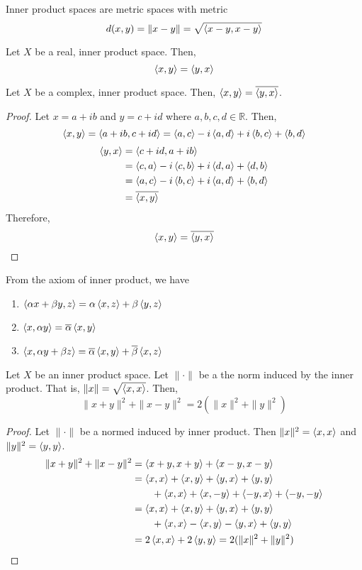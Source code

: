 \begin{remark}
	Inner product spaces are metric spaces with metric 
	\[ d(x,y) = \|x-y\| = \sqrt{\inner{x-y}{x-y}} \]
\end{remark}
\begin{remark}
	Let $X$ be a real, inner product space.
	Then, 
	\[ \inner{x}{y} = \inner{y}{x} \]
\end{remark}
\begin{remark}
	Let $X$ be a complex, inner product space.
	Then, $\inner{x}{y} = \conj{\inner{y}{x}}$.
\end{remark}
\begin{proof}
	Let $x = a+ib$ and $y = c+id$ where $a,b,c,d \in \mathbb{R}$.
	Then,
	\[ \inner{x}{y} = \inner{a+ib}{c+id} = \inner{a}{c} -i\inner{a}{d} + i\inner{b}{c} + \inner{b}{d} \]
	\begin{align*}
		\inner{y}{x} 
		& = \inner{c+id}{a+ib} \\
		& = \inner{c}{a} -i\inner{c}{b} + i\inner{d}{a} + \inner{d}{b} \\
		& = \inner{a}{c} -i\inner{b}{c} + i\inner{a}{d} + \inner{b}{d} \\
		& = \conj{\inner{x}{y}}
	\end{align*}
	Therefore,
	\[ \inner{x}{y} = \conj{\inner{y}{x}} \]
\end{proof}
\begin{remark}
	From the axiom of inner product, we have
	\begin{enumerate}
		\item $ \inner{\alpha x + \beta y}{z} = \alpha\inner{x}{z} + \beta\inner{y}{z}$
		\item $\inner{x}{\alpha y} = \conj{\alpha} \inner{x}{y}$
		\item $\inner{x}{\alpha y+\beta z} = \conj{\alpha}\inner{x}{y} + \conj{\beta}\inner{x}{z}$
	\end{enumerate}
\end{remark}

\begin{lemma}
	Let $X$ be an inner product space.
	Let $\|\cdot\|$ be a the norm induced by the inner product.
	That is, $\|x\| = \sqrt{\inner{x}{x}}$.
	Then,
	\[ \| x+y \|^2 + \| x-y \|^2 = 2(\|x\|^2+\|y\|^2) \]
\end{lemma}
\begin{proof}
	Let $\|\cdot\|$ be a normed induced by inner product.
	Then $\|x\|^2 = \inner{x}{x}$ and $\|y\|^2 = \inner{y}{y}$.
	\begin{align*}
		\|x+y\|^2+\|x-y\|^2 
		& = \inner{x+y}{x+y} + \inner{x-y}{x-y} \\
		& = \inner{x}{x} + \inner{x}{y} + \inner{y}{x} + \inner{y}{y} \\
		& \qquad + \inner{x}{x} + \inner{x}{-y} + \inner{-y}{x} + \inner{-y}{-y} \\
		& = \inner{x}{x} + \inner{x}{y} + \inner{y}{x} + \inner{y}{y} \\
		& \qquad + \inner{x}{x} - \inner{x}{y} - \inner{y}{x} + \inner{y}{y} \\
		& = 2\inner{x}{x} + 2\inner{y}{y} = 2(\|x\|^2+\|y\|^2)
	\end{align*}
\end{proof}

